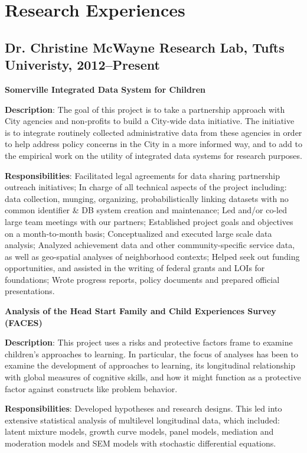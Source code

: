 \documentclass[letterpaper]{article}
\renewenvironment{itemize}{
  \begin{list}{}{
    \setlength{\leftmargin}{1.5em}
  }
}{
  \end{list}
}
\begin{document}
\section*{Research Experiences}

\subsection*{Dr. Christine McWayne Research Lab, Tufts Univeristy, 2012--Present}
\textbf{Somerville Integrated Data System for Children}
\begin{itemize}
\item \textbf{Description}: The goal of this project is to take a partnership approach with City agencies and non-profits to build a City-wide data initiative. The initiative is to integrate routinely collected administrative data from these agencies in order to help address policy concerns in the City in a more informed way, and to add to the empirical work on the utility of integrated data systems for research purposes. 
\item \textbf{Responsibilities}: Facilitated legal agreements for data sharing partnership outreach initiatives; In charge of all technical aspects of the project including: data collection, munging, organizing, probabilistically linking datasets with no common identifier \& DB system creation and maintenance; Led and/or co-led large team meetings with our partners; Established project goals and objectives on a month-to-month basis; Conceptualized and executed large scale data analysis; Analyzed achievement data and other community-specific service data, as well as geo-spatial analyses of neighborhood contexts; Helped seek out funding opportunities, and assisted in the writing of federal grants and LOIs for foundations; Wrote progress reports, policy documents and prepared official presentations. 

\end{itemize}

\textbf{Analysis of the Head Start Family and Child Experiences Survey (FACES)}
\begin{itemize}
\item \textbf{Description}: This project uses a risks and protective factors frame to examine children's approaches to learning. In particular, the focus of analyses has been to examine the development of approaches to learning, its longitudinal relationship with global measures of cognitive skills, and how it might function as a protective factor against constructs like problem behavior. 
\item \textbf{Responsibilities}: Developed hypotheses and research designs. This led into extensive statistical analysis of multilevel longitudinal data, which included: latent mixture models, growth curve models, panel models, mediation and moderation models and SEM models with stochastic differential equations. 
\end{itemize}
\end{document}

